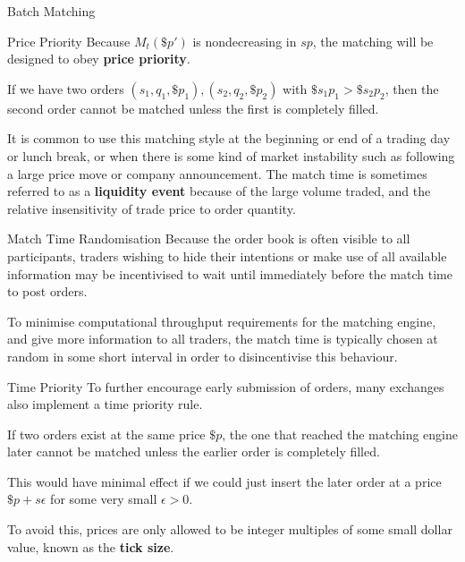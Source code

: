 \documentclass{beamer}
\begin{document}
\begin{frame}{Batch Matching}
	\begin{block}{Price Priority}
		Because $M_t(\$p')$ is nondecreasing in $sp$, the matching will be designed to obey \textbf{price priority}.
	
		If we have two orders $(s_1,q_1,\$p_1), (s_2,q_2,\$p_2)$ with $\$s_1p_1 > \$s_2p_2$, then the second order cannot be matched unless the first is completely filled.
	\end{block}

	It is common to use this matching style at the beginning or end of a trading day or lunch break, or when there is some kind of market instability such as following a large price move or company announcement. The match time is sometimes referred to as a \textbf{liquidity event} because of the large volume traded, and the relative insensitivity of trade price to order quantity.%

	\begin{block}{Match Time Randomisation}
		Because the order book is often visible to all participants, traders wishing to hide their intentions or make use of all available information may be incentivised to wait until immediately before the match time to post orders.

		To minimise computational throughput requirements for the matching engine, and give more information to all traders, the match time is typically chosen at random in some short interval in order to disincentivise this behaviour.

	\end{block}
	\begin{block}{Time Priority}
		To further encourage early submission of orders, many exchanges also implement a time priority rule.

		If two orders exist at the same price $\$p$, the one that reached the matching engine later cannot be matched unless the earlier order is completely filled.

		This would have minimal effect if we could just insert the later order at a price $\$p+s\epsilon$ for some very small $\epsilon>0$.

		To avoid this, prices are only allowed to be integer multiples of some small dollar value, known as the \textbf{tick size}.
	\end{block}
\end{frame}
\end{document}
